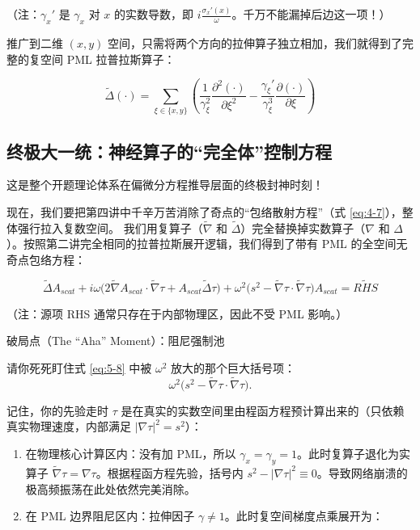 \documentclass[12pt]{article}
\begin{document}
{（注：$\gamma_x'$ 是 $\gamma_x$ 对 $x$ 的实数导数，即 $i\frac{\sigma_x'(x)}{\omega}$。千万不能漏掉后边这一项！）

推广到二维 $(x, y)$ 空间，只需将两个方向的拉伸算子独立相加，我们就得到了完整的复空间 PML 拉普拉斯算子：

\begin{equation}
\tilde{\Delta} (\cdot) =
\sum_{\xi \in \{x,y\}}
\left(
\frac{1}{\gamma_\xi^2}
\frac{\partial^2 (\cdot)}{\partial \xi^2}
-
\frac{\gamma_\xi'}{\gamma_\xi^3}
\frac{\partial (\cdot)}{\partial \xi}
\right)
\label{eq:5-7}
\end{equation}

\subsection{终极大一统：神经算子的“完全体”控制方程}

这是整个开题理论体系在偏微分方程推导层面的终极封神时刻！

现在，我们要把第四讲中千辛万苦消除了奇点的“包络散射方程”（式 \eqref{eq:4-7}），整体强行拉入复数空间。
我们用复算子（$\tilde{\nabla}$ 和 $\tilde{\Delta}$）完全替换掉实数算子（$\nabla$ 和 $\Delta$）。按照第二讲完全相同的拉普拉斯展开逻辑，我们得到了带有 PML 的全空间无奇点包络方程：

\begin{equation}
\tilde{\Delta} A_{scat}
+
i \omega \big(2 \tilde{\nabla} A_{scat} \cdot \tilde{\nabla} \tau + A_{scat} \tilde{\Delta} \tau \big)
+
\omega^2 \big(s^2 - \tilde{\nabla} \tau \cdot \tilde{\nabla} \tau \big) A_{scat}
=
\tilde{RHS}
\label{eq:5-8}
\end{equation}

（注：源项 RHS 通常只存在于内部物理区，因此不受 PML 影响。）

破局点（The ``Aha'' Moment）：阻尼强制池

请你死死盯住式 \eqref{eq:5-8} 中被 $\omega^2$ 放大的那个巨大括号项：
\[
\omega^2 \big(s^2 - \tilde{\nabla} \tau \cdot \tilde{\nabla} \tau \big).
\]

记住，你的先验走时 $\tau$ 是在真实的实数空间里由程函方程预计算出来的（只依赖真实物理速度，内部满足 $|\nabla \tau|^2 = s^2$）：

\begin{enumerate}[leftmargin=2em]
    \item 在物理核心计算区内：没有加 PML，所以 $\gamma_x = \gamma_y = 1$。此时复算子退化为实算子 $\tilde{\nabla} \tau = \nabla \tau$。根据程函方程先验，括号内 $s^2 - |\nabla \tau|^2 \equiv 0$。导致网络崩溃的极高频振荡在此处依然完美消除。
    \item 在 PML 边界阻尼区内：拉伸因子 $\gamma \neq 1$。此时复空间梯度点乘展开为：
\end{enumerate}

}
\end{document}
